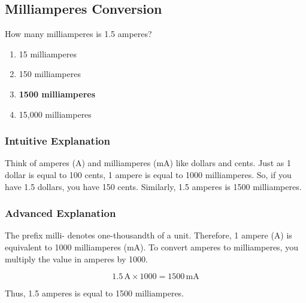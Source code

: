 \subsection{Milliamperes Conversion}
\label{T5B01}

\begin{tcolorbox}[colback=gray!10!white,colframe=black!75!black,title=T5B01]
How many milliamperes is 1.5 amperes?
\begin{enumerate}[noitemsep]
    \item 15 milliamperes
    \item 150 milliamperes
    \item \textbf{1500 milliamperes}
    \item 15,000 milliamperes
\end{enumerate}
\end{tcolorbox}

\subsubsection*{Intuitive Explanation}
Think of amperes (A) and milliamperes (mA) like dollars and cents. Just as 1 dollar is equal to 100 cents, 1 ampere is equal to 1000 milliamperes. So, if you have 1.5 dollars, you have 150 cents. Similarly, 1.5 amperes is 1500 milliamperes.

\subsubsection*{Advanced Explanation}
The prefix milli- denotes one-thousandth of a unit. Therefore, 1 ampere (A) is equivalent to 1000 milliamperes (mA). To convert amperes to milliamperes, you multiply the value in amperes by 1000. 

\[
1.5 \, \text{A} \times 1000 = 1500 \, \text{mA}
\]

Thus, 1.5 amperes is equal to 1500 milliamperes.